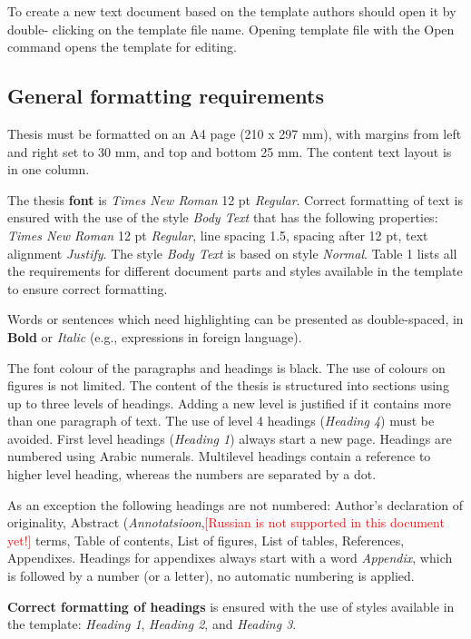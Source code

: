 To create a new text document based on the template authors should
open it by double- clicking on the template file name. Opening
template file with the Open command opens the template for editing.

\subsection{General formatting requirements}

Thesis must be formatted on an A4 page (210 x 297 mm), with margins
from left and right set to 30 mm, and top and bottom 25 mm. The
content text layout is in one column.

The thesis \textbf{font} is \textit{Times New Roman} 12 pt
\textit{Regular}. Correct formatting of text is ensured with the use
of the style \textit{Body Text} that has the following properties:
\textit{Times New Roman} 12 pt \textit{Regular}, line spacing 1.5,
spacing after 12 pt, text alignment \textit{Justify}. The style
\textit{Body Text} is based on style \textit{Normal}. Table 1 lists
all the requirements for different document parts and styles available
in the template to ensure correct formatting.

Words or sentences which need highlighting can be presented as
double-spaced, in \textbf{Bold} or \textit{Italic} (e.g., expressions
in foreign language).

The font colour of the paragraphs and headings is black. The use of
colours on figures is not limited.  The content of the thesis is
structured into sections using up to three levels of headings. Adding
a new level is justified if it contains more than one paragraph of
text. The use of level 4 headings (\textit{Heading 4}) must be
avoided. First level headings (\textit{Heading 1}) always start a new
page. Headings are numbered using Arabic numerals. Multilevel headings
contain a reference to higher level heading, whereas the numbers are
separated by a dot.

As an exception the following headings are not numbered: Author’s
declaration of originality, Abstract
(\textit{Annotatsioon},\textcolor{red}{[Russian is not supported in
  this document yet!]}  %
terms, Table of contents, List of figures, List of tables, References,
Appendixes. Headings for appendixes always start with a word
\textit{Appendix}, which is followed by a number (or a letter), no
automatic numbering is applied.

\textbf{Correct formatting of headings} is ensured with the use of
styles available in the template: \textit{Heading 1}, \textit{Heading
  2}, and \textit{Heading 3}.

